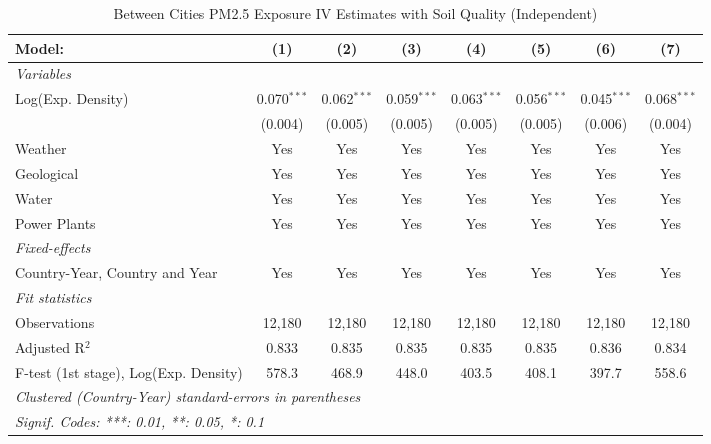 
\begin{table}[htbp]
   \caption{\label{tab:iv_soil_rob2} Between Cities PM2.5 Exposure IV Estimates with Soil Quality (Independent)}
   \centering
   \small
   \begin{tabular}{lccccccc}
      \tabularnewline \midrule \midrule
      Model:                                & (1)           & (2)           & (3)           & (4)           & (5)           & (6)           & (7)\\  
      \midrule
      \emph{Variables}\\
      Log(Exp. Density)                     & 0.070$^{***}$ & 0.062$^{***}$ & 0.059$^{***}$ & 0.063$^{***}$ & 0.056$^{***}$ & 0.045$^{***}$ & 0.068$^{***}$\\   
                                            & (0.004)       & (0.005)       & (0.005)       & (0.005)       & (0.005)       & (0.006)       & (0.004)\\   
      Weather                               & Yes           & Yes           & Yes           & Yes           & Yes           & Yes           & Yes\\  
      Geological                            & Yes           & Yes           & Yes           & Yes           & Yes           & Yes           & Yes\\  
      Water                                 & Yes           & Yes           & Yes           & Yes           & Yes           & Yes           & Yes\\  
      Power Plants                          & Yes           & Yes           & Yes           & Yes           & Yes           & Yes           & Yes\\  
      \midrule
      \emph{Fixed-effects}\\
      Country-Year, Country and Year        & Yes           & Yes           & Yes           & Yes           & Yes           & Yes           & Yes\\  
      \midrule
      \emph{Fit statistics}\\
      Observations                          & 12,180        & 12,180        & 12,180        & 12,180        & 12,180        & 12,180        & 12,180\\  
      Adjusted R$^2$                        & 0.833         & 0.835         & 0.835         & 0.835         & 0.835         & 0.836         & 0.834\\  
      F-test (1st stage), Log(Exp. Density) & 578.3         & 468.9         & 448.0         & 403.5         & 408.1         & 397.7         & 558.6\\  
      \midrule \midrule
      \multicolumn{8}{l}{\emph{Clustered (Country-Year) standard-errors in parentheses}}\\
      \multicolumn{8}{l}{\emph{Signif. Codes: ***: 0.01, **: 0.05, *: 0.1}}\\
   \end{tabular}
   

\end{table}

